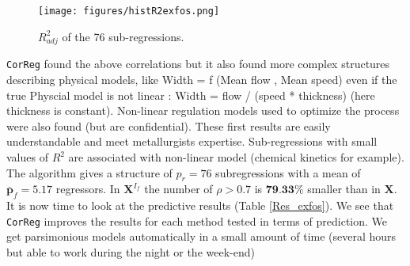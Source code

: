 \documentclass[12pt,a4paper]{report}
\begin{document}
		
		\begin{figure}[h!]
		\centering
			\texttt{[image: figures/histR2exfos.png]} 
			\caption{$R^2_{adj}$ of the 76 sub-regressions.}
\end{figure} 
		
		
	{\tt CorReg} found the above correlations but it also found more complex structures describing physical models, like   Width = f (Mean flow , Mean speed) even if the true Physcial model is not linear : Width = flow / (speed * thickness) (here thickness is constant). Non-linear regulation models used to optimize the process were also found (but are confidential). These first results are easily understandable and meet metallurgists expertise.  Sub-regressions with small values of $R^2$ are associated with non-linear model (chemical kinetics for example).
			The algorithm gives a structure of $p_r=76$ subregressions with a mean of $\bar{\boldsymbol{p}}_f=5.17$ regressors. In $\boldsymbol{X}^{I_f}$ the number of $\rho>0.7$ is $\textbf{79.33\%}$ smaller than in $\boldsymbol{X}$.		
	\\
	
	
			It is now time to look at the predictive results (Table \ref{Res_exfos}). We see that {\tt CorReg} improves the results for each method tested in terms of prediction.
			We get parsimonious models automatically in a small amount of time (several hours but able to work during the night or the week-end)
\end{document}
